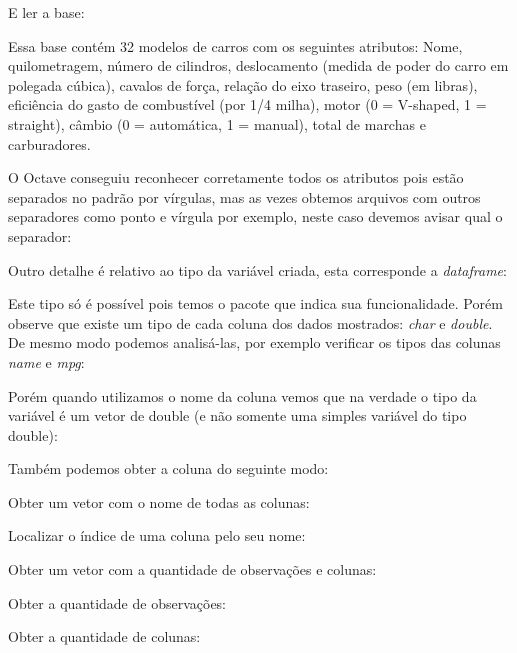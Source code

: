 \documentclass[a4paper,11pt]{article}
\begin{document}
E ler a base:

Essa base contém 32 modelos de carros com os seguintes atributos: Nome, quilometragem, número de cilindros, deslocamento (medida de poder do carro em polegada cúbica), cavalos de força, relação do eixo traseiro, peso (em libras), eficiência do gasto de combustível (por 1/4 milha), motor (0 = V-shaped, 1 = straight), câmbio (0 = automática, 1 = manual), total de marchas e carburadores.

O Octave conseguiu reconhecer corretamente todos os atributos pois estão separados no padrão por vírgulas, mas as vezes obtemos arquivos com outros separadores como ponto e vírgula por exemplo, neste caso devemos avisar qual o separador: \\

Outro detalhe é relativo ao tipo da variável criada, esta corresponde a \textit{dataframe}: \\

Este tipo só é possível pois temos o pacote que indica sua funcionalidade. Porém observe que existe um tipo de cada coluna dos dados mostrados: \textit{char} e \textit{double}. De mesmo modo podemos analisá-las, por exemplo verificar os tipos das colunas \textit{name} e \textit{mpg}:

Porém quando utilizamos o nome da coluna vemos que na verdade o tipo da variável é um vetor de double (e não somente uma simples variável do tipo double): \\

Também podemos obter a coluna do seguinte modo: \\

Obter um vetor com o nome de todas as colunas: \\

Localizar o índice de uma coluna pelo seu nome: \\

Obter um vetor com a quantidade de observações e colunas: \\

Obter a quantidade de observações: \\

Obter a quantidade de colunas: \\
\end{document}
